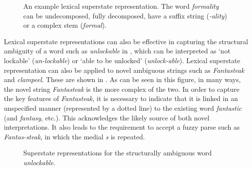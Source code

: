 \documentclass[output=paper]{langsci/langscibook}
\begin{document}
\begin{figure}
\caption{\label{fig:libben:1}An example lexical superstate representation. The word \textit{formality} can be undecomposed, fully decomposed, have a suffix string (\textit{-ality}) or a complex stem (\textit{formal}).}
\end{figure}

Lexical superstate representations can also be effective in capturing the structural ambiguity of a word such as \textit{unlockable} in , which can be interpreted as `not lockable' (\textit{un-lockable}) or `able to be unlocked' (\textit{unlock-able}). Lexical superstate representation can also be applied to novel ambiguous strings such as \textit{Fantasteak} and \textit{clampeel}. These are shown in . As can be seen in this figure, in many ways, the novel string \textit{Fantasteak} is the more complex of the two. In order to capture the key features of \textit{Fantasteak}, it is necessary to indicate that it is linked in an unspecified manner (represented by a dotted line) to the existing word \textit{fantastic} (and \textit{fantasy}, etc.). This acknowledges the likely source of both novel interpretations. It also leads to the requirement to accept a fuzzy parse such as \textit{Fantas-steak}, in which the medial \textit{s} is repeated.


\begin{figure}
\caption{\label{fig:libben:2}Superstate representations for the structurally ambiguous word \textit{unlockable}.}
\end{figure}
\end{document}
